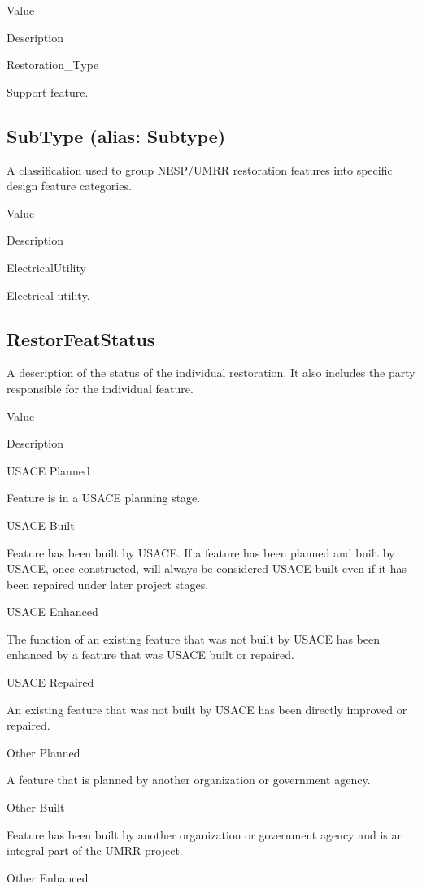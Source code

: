 \documentclass[
  letterpaper,
  DIV=11,
  numbers=noendperiod]{scrreprt}
\begin{document}
Value

Description

Restoration\_Type

Support feature.

\subsection{SubType (alias: Subtype)}\label{subtype-alias-subtype-19}

A classification used to group NESP/UMRR restoration features into
specific design feature categories.

Value

Description

ElectricalUtility

Electrical utility.

\subsection{RestorFeatStatus}\label{restorfeatstatus-19}

A description of the status of the individual restoration. It also
includes the party responsible for the individual feature.

Value

Description

USACE Planned

Feature is in a USACE planning stage.

USACE Built

Feature has been built by USACE. If a feature has been planned and built
by USACE, once constructed, will always be considered USACE built even
if it has been repaired under later project stages.

USACE Enhanced

The function of an existing feature that was not built by USACE has been
enhanced by a feature that was USACE built or repaired.

USACE Repaired

An existing feature that was not built by USACE has been directly
improved or repaired.

Other Planned

A feature that is planned by another organization or government agency.

Other Built

Feature has been built by another organization or government agency and
is an integral part of the UMRR project.

Other Enhanced
\end{document}
